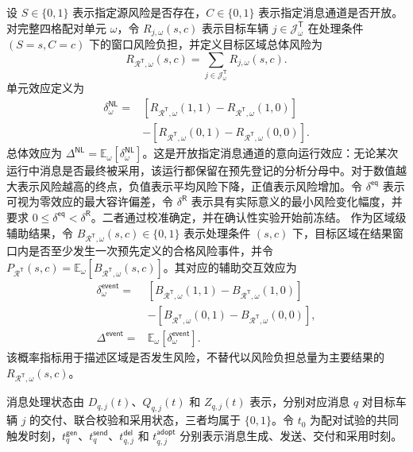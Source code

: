 \documentclass[10pt,a4paper,twocolumn]{article}
\begin{document}
设 $S\in\{0,1\}$ 表示指定源风险是否存在，$C\in\{0,1\}$ 表示指定消息通道是否开放。对完整四格配对单元 $\omega$，令 $R_{j,\omega}(s,c)$ 表示目标车辆 $j\in\mathcal J^{\mathsf T}_{\omega}$ 在处理条件 $(S=s,C=c)$ 下的窗口风险负担，并定义目标区域总体风险为
\begin{equation}
R_{\mathcal R^{\mathsf T},\omega}(s,c)=\sum_{j\in\mathcal J^{\mathsf T}_{\omega}}R_{j,\omega}(s,c).
\end{equation}
单元效应定义为
\begin{equation}
\begin{aligned}
\delta_{\omega}^{\mathsf{NL}}={}&[R_{\mathcal R^{\mathsf T},\omega}(1,1)-R_{\mathcal R^{\mathsf T},\omega}(1,0)]\\
&-[R_{\mathcal R^{\mathsf T},\omega}(0,1)-R_{\mathcal R^{\mathsf T},\omega}(0,0)].
\end{aligned}
\end{equation}
总体效应为 $\Delta^{\mathsf{NL}}=\mathbb E_\omega[\delta_\omega^{\mathsf{NL}}]$。这是开放指定消息通道的意向运行效应：无论某次运行中消息是否最终被采用，该运行都保留在预先登记的分析分母中。对于数值越大表示风险越高的终点，负值表示平均风险下降，正值表示风险增加。令 $\delta^{\mathsf{eq}}$ 表示可视为零效应的最大容许偏差，令 $\delta^{\mathsf R}$ 表示具有实际意义的最小风险变化幅度，并要求 $0\leq\delta^{\mathsf{eq}}<\delta^{\mathsf R}$。二者通过校准确定，并在确认性实验开始前冻结。
作为区域级辅助结果，令 $B_{\mathcal R^{\mathsf T},\omega}(s,c)\in\{0,1\}$ 表示处理条件 $(s,c)$ 下，目标区域在结果窗口内是否至少发生一次预先定义的合格风险事件，并令 $P_{\mathcal R^{\mathsf T}}(s,c)=\mathbb E_\omega[B_{\mathcal R^{\mathsf T},\omega}(s,c)]$。其对应的辅助交互效应为
\begin{equation}
\begin{aligned}
\delta_{\omega}^{\mathsf{event}}={}&[B_{\mathcal R^{\mathsf T},\omega}(1,1)-B_{\mathcal R^{\mathsf T},\omega}(1,0)]\\
&-[B_{\mathcal R^{\mathsf T},\omega}(0,1)-B_{\mathcal R^{\mathsf T},\omega}(0,0)],\\
\Delta^{\mathsf{event}}={}&\mathbb E_\omega[\delta_{\omega}^{\mathsf{event}}].
\end{aligned}
\end{equation}
该概率指标用于描述区域是否发生风险，不替代以风险负担总量为主要结果的 $R_{\mathcal R^{\mathsf T},\omega}(s,c)$。

消息处理状态由 $D_{q,j}(t)$、$Q_{q,j}(t)$ 和 $Z_{q,j}(t)$ 表示，分别对应消息 $q$ 对目标车辆 $j$ 的交付、联合校验和采用状态，三者均属于 $\{0,1\}$。令 $t_0$ 为配对试验的共同触发时刻，$t_q^{\mathsf{gen}}$、$t_q^{\mathsf{send}}$、$t_{q,j}^{\mathsf{del}}$ 和 $t_{q,j}^{\mathsf{adopt}}$ 分别表示消息生成、发送、交付和采用时刻。
\end{document}
